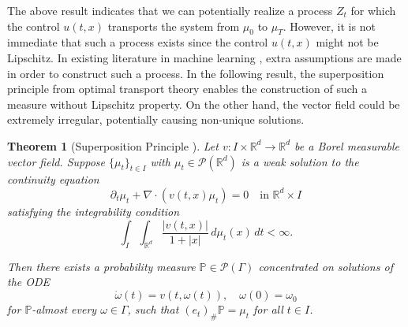 \documentclass{article}
\newtheorem{theorem}{Theorem}[section]
\newcommand{\Rd}{\mathbb{R}^d}
\begin{document}

The above result indicates that we can potentially realize a process $Z_t$ for which the control $u(t,x)$ transports the system from $\mu_0$ to $\mu_T$. However, it is not immediate that such a process exists since the control $u(t,x)$ might not be Lipschitz. In existing literature in machine learning \cite{albergo2023stochastic,liu2022flow,lipmanflow}, extra assumptions are made in order to construct such a process. In the following result, the superposition principle from optimal transport theory \cite[Theorem 3.4]{ambrosio2014continuity} enables the construction of such a measure without Lipschitz property. On the other hand, the vector field could be extremely irregular, potentially causing non-unique solutions.

\begin{theorem}[Superposition Principle {\cite{ambrosio2014continuity}}]
\label{thm:superposition}
Let $v: I \times \mathbb{R}^d \rightarrow \mathbb{R}^d$ be a Borel measurable vector field. Suppose $\{\mu_t\}_{t \in I}$ with $\mu_t \in \mathcal{P}(\mathbb{R}^d)$ is a weak solution to the continuity equation
\begin{equation}
\partial_t \mu_t + \nabla \cdot (v(t,x) \mu_t) = 0 \quad \text{in } \mathbb{R}^d \times I
\end{equation}
satisfying the integrability condition
\[\int_I \int_{\mathbb{R}^d} \frac{|v(t,x)|}{1+|x|} \, d\mu_t(x) \, dt < \infty.\]

Then there exists a probability measure $\mathbb{P} \in \mathcal{P}(\Gamma)$ concentrated on solutions of the ODE
\begin{equation}
\dot{\omega}(t) = v(t,\omega(t)), \quad \omega(0) = \omega_0
\end{equation}
for $\mathbb{P}$-almost every $\omega \in \Gamma$, such that $(e_t)_{\#}\mathbb{P} = \mu_t$ for all $t \in I$.
\end{theorem}
\end{document}
